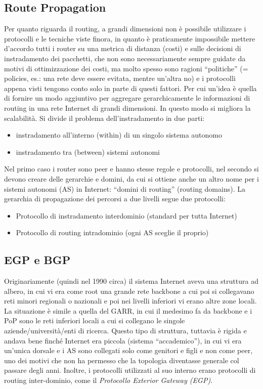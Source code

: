 \subsection{Route Propagation}
Per quanto riguarda il routing, a grandi dimensioni non è possibile utilizzare i protocolli e le tecniche viste finora, in quanto è praticamente impossibile mettere d’accordo tutti i router su una metrica di distanza (costi) e sulle decisioni di instradamento dei pacchetti, che non sono necessariamente sempre guidate da motivi di ottimizzazione dei costi, ma molto spesso sono ragioni “politiche” (= policies, es.: una rete deve essere evitata, mentre un’altra no) e i protocolli appena visti tengono conto solo in parte di questi fattori. Per cui un’idea è quella di fornire un modo aggiuntivo per aggregare gerarchicamente le informazioni di routing in una rete Internet di grandi dimensioni. In questo modo si migliora la scalabilità. Si divide il problema dell’instradamento in due parti:
\begin{itemize}
  \item instradamento all’interno (within) di un singolo sistema autonomo
  \item instradamento tra (between) sistemi autonomi
\end{itemize}
Nel primo caso i router sono peer e hanno stesse regole e protocolli, nel secondo si devono creare delle gerarchie e domini, da cui si ottiene anche un altro nome per i sistemi autonomi (AS) in Internet: “domini di routing” (routing domains). La gerarchia di propagazione dei percorsi a due livelli segue due protocolli:
\begin{itemize}
  \item Protocollo di instradamento interdominio (standard per tutta Internet)
  \item Protocollo di routing intradominio (ogni AS sceglie il proprio)
\end{itemize}
\subsection{EGP e BGP}
Originariamente (quindi nel 1990 circa) il sistema Internet aveva una struttura ad albero, in cui vi era come root una grande rete backbone a cui poi si collegavano reti minori regionali o nazionali e poi nei livelli inferiori vi erano altre zone locali. La situazione è simile a quella del GARR, in cui il medesimo fa da backbone e i PoP sono le reti inferiori locali a cui si collegano le singole aziende/università/enti di ricerca. Questo tipo di struttura, tuttavia è rigida e andava bene finché Internet era piccola (sistema “accademico”), in cui vi era un’unica dorsale e i AS sono collegati solo come genitori e figli e non come peer, uno dei motivi che non ha permesso che la topologia diventasse generale col passare degli anni. Inoltre, i protocolli utilizzati al suo interno erano protocolli di routing inter-dominio, come il \textit{Protocollo Exterior Gateway (EGP)}. \\

